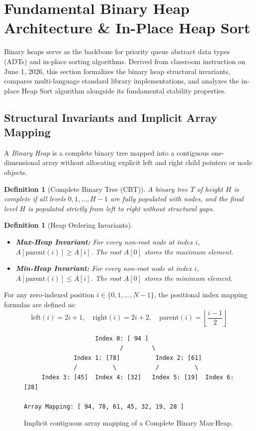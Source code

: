 \documentclass[10pt,journal,compsoc,onecolumn]{IEEEtran}
\newtheorem{definition}[theorem]{Definition}
\begin{document}
\section{Fundamental Binary Heap Architecture \& In-Place Heap Sort}
\label{sec:heap-sort}

Binary heaps serve as the backbone for priority queue abstract data types (ADTs) and in-place sorting algorithms. Derived from classroom instruction on June 1, 2026, this section formalizes the binary heap structural invariants, compares multi-language standard library implementations, and analyzes the in-place Heap Sort algorithm alongside its fundamental stability properties.

\subsection{Structural Invariants and Implicit Array Mapping}

A \emph{Binary Heap} is a complete binary tree mapped into a contiguous one-dimensional array without allocating explicit left and right child pointers or node objects.

\begin{definition}[Complete Binary Tree (CBT)]
A binary tree $T$ of height $H$ is complete if all levels $0, 1, \dots, H-1$ are fully populated with nodes, and the final level $H$ is populated strictly from left to right without structural gaps.
\end{definition}

\begin{definition}[Heap Ordering Invariants]
\begin{itemize}
    \item \textbf{Max-Heap Invariant:} For every non-root node at index $i$, $A[\text{parent}(i)] \ge A[i]$. The root $A[0]$ stores the maximum element.
    \item \textbf{Min-Heap Invariant:} For every non-root node at index $i$, $A[\text{parent}(i)] \le A[i]$. The root $A[0]$ stores the minimum element.
\end{itemize}
\end{definition}

For any zero-indexed position $i \in \{0, 1, \dots, N-1\}$, the positional index mapping formulas are defined as:
\[
\text{left}(i) = 2i + 1, \quad \text{right}(i) = 2i + 2, \quad \text{parent}(i) = \left\lfloor \frac{i - 1}{2} \right\rfloor
\]

\begin{figure}[htbp]
\centering
\begin{verbatim}
                    Index 0: [ 94 ]
                           /        \
              Index 1: [78]          Index 2: [61]
              /          \           /          \
     Index 3: [45]  Index 4: [32]   Index 5: [19]  Index 6: [28]

Array Mapping: [ 94, 78, 61, 45, 32, 19, 28 ]
\end{verbatim}
\caption{Implicit contiguous array mapping of a Complete Binary Max-Heap.}
\label{fig:max-heap-layout}
\end{figure}
\end{document}
